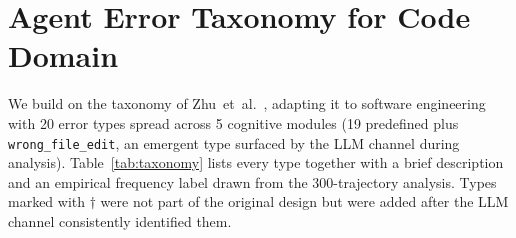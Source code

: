 \documentclass{ieeeaccess}
\begin{document}
\section{Agent Error Taxonomy for Code Domain}
\label{sec:taxonomy}

We build on the taxonomy of Zhu~et~al.\ \cite{b5}, adapting it to software engineering with 20 error types spread across 5 cognitive modules (19 predefined plus \texttt{wrong\_file\_edit}, an emergent type surfaced by the LLM channel during analysis). Table~\ref{tab:taxonomy} lists every type together with a brief description and an empirical frequency label drawn from the 300-trajectory analysis. Types marked with $\dagger$ were not part of the original design but were added after the LLM channel consistently identified them.
\end{document}

